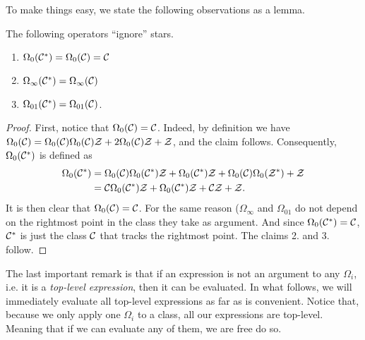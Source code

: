 \documentclass[12pt, a4paper, twoside]{report}
\begin{document}
To make things easy, we state the following observations as a lemma.
\begin{lemma}
  The following operators ``ignore'' stars.
  \begin{enumerate}
  \item $\Omega_0(\mathcal{C}^*) = \Omega_0(\mathcal{C}) = \mathcal{C}$
  \item $\Omega_\infty(\mathcal{C}^*) = \Omega_\infty(\mathcal{C})$
  \item $\Omega_{01}(\mathcal{C}^*) = \Omega_{01}(\mathcal{C})$.
  \end{enumerate}
  \label{lem:ignorance}
\end{lemma}
\begin{proof}
First, notice that $\Omega_0(\mathcal{C}) = \mathcal{C}$. Indeed, by definition we have $\Omega_0(\mathcal{C}) = \Omega_0(\mathcal{C})\Omega_0(\mathcal{C})\mathcal{Z} + 2\Omega_0(\mathcal{C})\mathcal{Z} + \mathcal{Z}$, and the claim follows. Consequently, $\Omega_0(\mathcal{C}^*)$ is defined as
\begin{align*}
  \Omega_0(\mathcal{C}^*) &= \Omega_0(\mathcal{C})\Omega_0(\mathcal{C}^*)\mathcal{Z} + \Omega_0(\mathcal{C}^*)\mathcal{Z} + \Omega_0(\mathcal{C})\Omega_0(\mathcal{Z}^*) + \mathcal{Z}\\
                   &=\mathcal{C}\Omega_0(\mathcal{C}^*)\mathcal{Z} + \Omega_0(\mathcal{C}^*)\mathcal{Z} + \mathcal{C}\mathcal{Z} + \mathcal{Z}.
\end{align*}
It is then clear that $\Omega_0(\mathcal{C}) = \mathcal{C}$. For the same reason ($\Omega_\infty$ and $\Omega_{01}$ do not depend on the rightmost point in the class they take as argument. And since $\Omega_0(\mathcal{C}^*) = \mathcal{C}$, $\mathcal{C}^*$ is just the class $\mathcal{C}$ that tracks the rightmost point. The claims 2. and 3. follow.
\end{proof}

The last important remark is that if an expression is not an argument to any $\Omega_i$, i.e. it is a \emph{top-level expression}, then it can be evaluated. In what follows, we will immediately evaluate all top-level expressions as far as is convenient. Notice that, because we only apply one $\Omega_i$ to a class, all our expressions are top-level. Meaning that if we can evaluate any of them, we are free do so.
\end{document}
